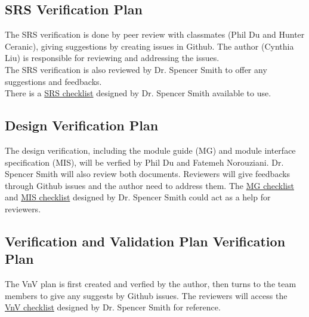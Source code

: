 \documentclass[12pt, titlepage]{article}
\begin{document}
\subsection{SRS Verification Plan}\label{SRSVP}
The SRS verification is done by peer review with classmates (Phil Du and Hunter Ceranic), giving suggestions by creating issues in Github. The author (Cynthia Liu) is responsible for reviewing and addressing the issues.\\
The SRS verification is also reviewed by Dr. Spencer Smith to offer any suggestions and feedbacks.\\
There is a \href{https://github.com/CynthiaLiu0805/BridgeCorrosion/blob/main/docs/Checklists/SRS-Checklist.pdf}{SRS checklist} designed by Dr. Spencer Smith available to use.


\subsection{Design Verification Plan}\label{DVP}
The design verification, including the module guide (MG) and module interface specification (MIS), will be verfied by Phil Du and Fatemeh Norouziani. Dr. Spencer Smith will also review both documents. Reviewers will give feedbacks through Github issues and the author need to address them. The \href{https://github.com/CynthiaLiu0805/BridgeCorrosion/blob/main/docs/Checklists/MG-Checklist.pdf}{MG checklist} and \href{https://github.com/CynthiaLiu0805/BridgeCorrosion/blob/main/docs/Checklists/MIS-Checklist.pdf}{MIS checklist} designed by Dr. Spencer Smith could act as a help for reviewers.



\subsection{Verification and Validation Plan Verification Plan}\label{VnVP}
The VnV plan is first created and verfied by the author, then turns to the team members to give any suggests by Github issues. The reviewers will access the \href{https://github.com/CynthiaLiu0805/BridgeCorrosion/blob/main/docs/Checklists/VnV-Checklist.pdf}{VnV checklist} designed by Dr. Spencer Smith for reference.
\end{document}
